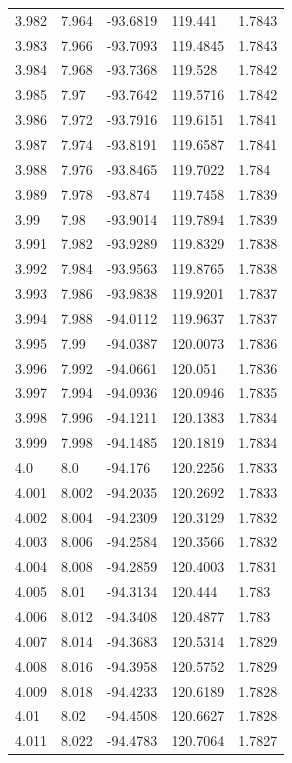 \begin{tabular}{lllll}
3.982 & 7.964 & -93.6819 & 119.441 & 1.7843 \\
3.983 & 7.966 & -93.7093 & 119.4845 & 1.7843 \\
3.984 & 7.968 & -93.7368 & 119.528 & 1.7842 \\
3.985 & 7.97 & -93.7642 & 119.5716 & 1.7842 \\
3.986 & 7.972 & -93.7916 & 119.6151 & 1.7841 \\
3.987 & 7.974 & -93.8191 & 119.6587 & 1.7841 \\
3.988 & 7.976 & -93.8465 & 119.7022 & 1.784 \\
3.989 & 7.978 & -93.874 & 119.7458 & 1.7839 \\
3.99 & 7.98 & -93.9014 & 119.7894 & 1.7839 \\
3.991 & 7.982 & -93.9289 & 119.8329 & 1.7838 \\
3.992 & 7.984 & -93.9563 & 119.8765 & 1.7838 \\
3.993 & 7.986 & -93.9838 & 119.9201 & 1.7837 \\
3.994 & 7.988 & -94.0112 & 119.9637 & 1.7837 \\
3.995 & 7.99 & -94.0387 & 120.0073 & 1.7836 \\
3.996 & 7.992 & -94.0661 & 120.051 & 1.7836 \\
3.997 & 7.994 & -94.0936 & 120.0946 & 1.7835 \\
3.998 & 7.996 & -94.1211 & 120.1383 & 1.7834 \\
3.999 & 7.998 & -94.1485 & 120.1819 & 1.7834 \\
4.0 & 8.0 & -94.176 & 120.2256 & 1.7833 \\
4.001 & 8.002 & -94.2035 & 120.2692 & 1.7833 \\
4.002 & 8.004 & -94.2309 & 120.3129 & 1.7832 \\
4.003 & 8.006 & -94.2584 & 120.3566 & 1.7832 \\
4.004 & 8.008 & -94.2859 & 120.4003 & 1.7831 \\
4.005 & 8.01 & -94.3134 & 120.444 & 1.783 \\
4.006 & 8.012 & -94.3408 & 120.4877 & 1.783 \\
4.007 & 8.014 & -94.3683 & 120.5314 & 1.7829 \\
4.008 & 8.016 & -94.3958 & 120.5752 & 1.7829 \\
4.009 & 8.018 & -94.4233 & 120.6189 & 1.7828 \\
4.01 & 8.02 & -94.4508 & 120.6627 & 1.7828 \\
4.011 & 8.022 & -94.4783 & 120.7064 & 1.7827 \\

\end{tabular}

